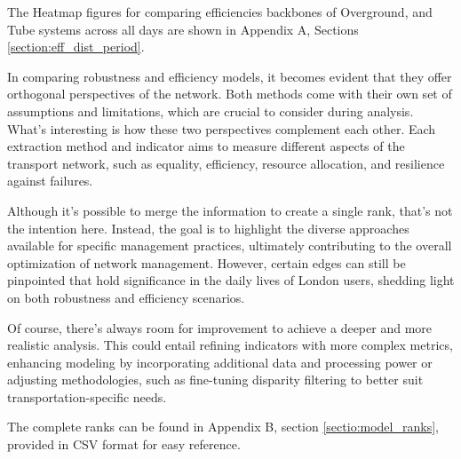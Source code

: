 \qquad The Heatmap figures for comparing efficiencies backbones of Overground, and Tube systems across all days are shown in Appendix A, Sections \ref{section:eff_dist_period}.

\qquad In comparing robustness and efficiency models, it becomes evident that they offer orthogonal perspectives of the network. Both methods come with their own set of assumptions and limitations, which are crucial to consider during analysis. What's interesting is how these two perspectives complement each other. Each extraction method and indicator aims to measure different aspects of the transport network, such as equality, efficiency, resource allocation, and resilience against failures.

\qquad Although it's possible to merge the information to create a single rank, that's not the intention here. Instead, the goal is to highlight the diverse approaches available for specific management practices, ultimately contributing to the overall optimization of network management. However, certain edges can still be pinpointed that hold significance in the daily lives of London users, shedding light on both robustness and efficiency scenarios.

\qquad Of course, there's always room for improvement to achieve a deeper and more realistic analysis. This could entail refining indicators with more complex metrics, enhancing modeling by incorporating additional data and processing power or adjusting methodologies, such as fine-tuning disparity filtering to better suit transportation-specific needs.

\qquad The complete ranks can be found in Appendix B, section \ref{sectio:model_ranks}, provided in CSV format for easy reference.